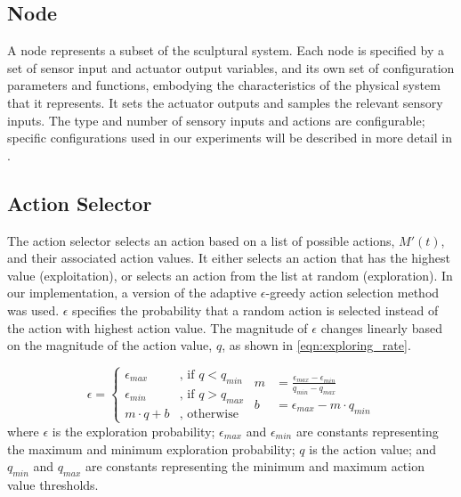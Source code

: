 \subsection{Node}
A node represents a subset of the sculptural system. Each node is specified by a set of sensor input and actuator output variables, and its own set of configuration parameters and functions, embodying the characteristics of the physical system that it represents. It sets the actuator outputs and samples the relevant sensory inputs.  The type and number of sensory inputs and actions are configurable; specific configurations used in our experiments will be described in more detail in .

\subsection{Action Selector}

The action selector selects an action based on a list of possible actions, $M'(t)$, and their associated action values. It either selects an action that has the highest value (exploitation), or selects an action from the list at random (exploration). In our implementation, a version of the adaptive $\epsilon$-greedy \cite{Tokic2010} action selection method was used. $\epsilon$ specifies the probability that a random action is selected instead of the action with highest action value. The magnitude of $\epsilon$ changes linearly based on the magnitude of the action value, $q$, as shown in \eqref{eqn:exploring_rate}. 

\begin{subequations}\label{eqn:exploring_rate}
	\begin{equation}
		\epsilon = 
		\begin{cases}
			\epsilon_{max}  &\text{, if } q < q_{min} \\
			\epsilon_{min}  &\text{, if } q > q_{max} \\
			m \cdot q + b   &\text{, otherwise} 
		\end{cases}
	\end{equation}
	\begin{flalign}
		m &= \frac{\epsilon_{max} - \epsilon_{min}}{q_{min} - q_{max}} \\
		b &= \epsilon_{max} - m \cdot q_{min} 
	\end{flalign}
\end{subequations}
where $\epsilon$ is the exploration probability; $\epsilon_{max}$ and $\epsilon_{min}$ are constants representing the maximum and minimum exploration probability; $q$ is the action value; and $q_{min}$ and $q_{max}$ are constants representing the minimum and maximum action value thresholds.

